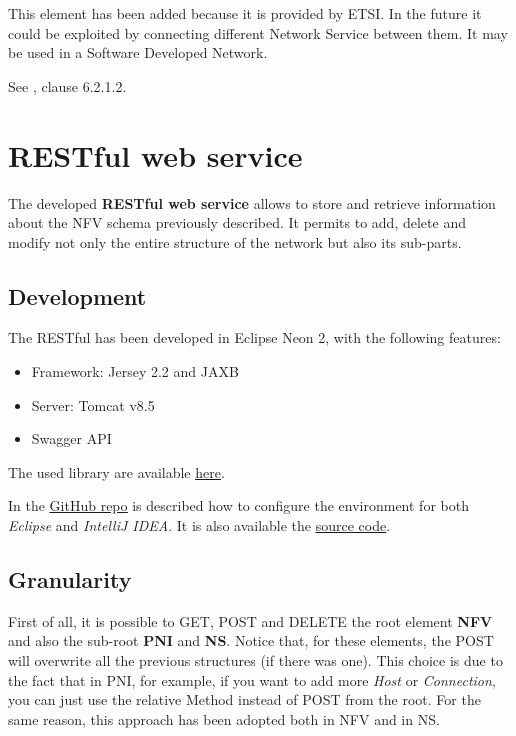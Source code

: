 \documentclass[11pt, english]{article}
\begin{document}
This element has been added because it is provided by ETSI. In the future it could be exploited by connecting different Network Service between them. It may be used in a Software Developed Network.

See \cite{etsi}, clause 6.2.1.2.

\section{RESTful web service}
The developed \textbf{RESTful web service} allows to store and retrieve information about the NFV schema previously described. It permits to add, delete and modify not only the entire structure of the network but also its sub-parts.

\subsection{Development}
The RESTful has been developed in Eclipse Neon 2, with the following features:
\begin{itemize}
    \item Framework: Jersey 2.2 and JAXB
    \item Server: Tomcat v8.5
    \item Swagger API
\end{itemize}

The used library are available  \href{https://github.com/netgroup-polito/nfv-data-model/tree/master/lib}{\underline{here}}.

In the \href{https://github.com/netgroup-polito/nfv-data-model/blob/master/README.md#configuration}{\underline{GitHub repo}} is described how to configure the environment for both \textit{Eclipse} and \textit{IntelliJ IDEA}. It is also available the \href{https://github.com/netgroup-polito/nfv-data-model}{\underline{source code}}. 

\subsection{Granularity}
First of all, it is possible to GET, POST and DELETE the root element \textbf{NFV} and also the sub-root \textbf{PNI} and \textbf{NS}. Notice that, for these elements, the POST will overwrite all the previous structures (if there was one). This choice is due to the fact that in PNI, for example, if you want to add more \textit{Host} or \textit{Connection}, you can just use the relative Method instead of POST from the root. For the same reason, this approach has been adopted both in NFV and in NS.
\end{document}
